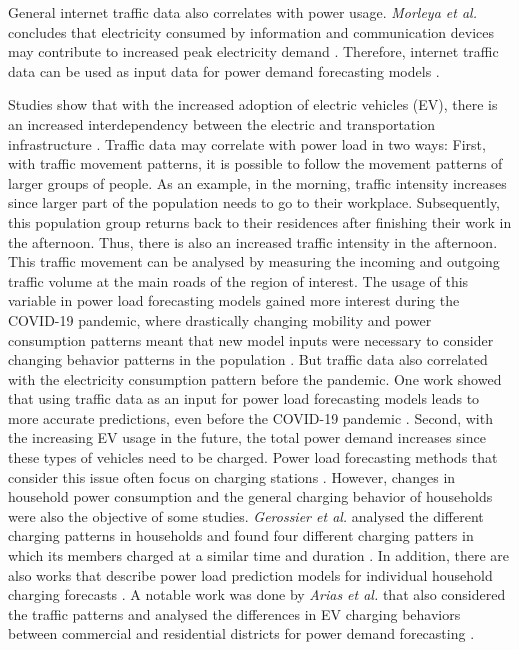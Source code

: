 General internet traffic data also correlates with power usage.
\textit{Morleya et al.} concludes that 
electricity consumed by information and communication devices
may contribute to increased peak electricity demand 
\cite{internettrafficenergycorrelation}.
Therefore, internet traffic data can be used as input data for 
power demand forecasting models \cite{electricityinternetforecast}. 

Studies show that with the increased adoption of electric vehicles (EV), 
there is an increased interdependency between the electric and 
transportation infrastructure \cite{interdependnytrafficenergy}. 
Traffic data may correlate with power load in two ways:
First, with traffic movement patterns, it is possible to follow the
movement patterns of larger groups of people. As an example, in the morning,
traffic intensity increases since larger part of the population needs
to go to their workplace. Subsequently, this population group
returns back to their residences after finishing their work in the afternoon.
Thus, there is also an increased traffic intensity in the afternoon.
This traffic movement can be analysed by measuring the 
incoming and outgoing traffic volume at the main roads of the 
region of interest. The usage of this variable in power load
forecasting models gained more interest during the COVID-19 pandemic, 
where drastically changing mobility and power consumption 
patterns meant that new model inputs were necessary to consider changing
behavior patterns in the population 
\cite{covidtrafficpower} \cite{covidtrafficpower2}.
But traffic data also correlated with the electricity consumption pattern
before the pandemic. One work showed that
using traffic data as an input for power load
forecasting models leads to more accurate predictions, even before
the COVID-19 pandemic \cite{causalmodeltrafficelectricity}.
Second, with the increasing EV usage in the future, 
the total power demand increases since these types of vehicles 
need to be charged. Power load forecasting methods that consider this
issue often focus on charging stations \cite{evcharchingstations}
\cite{evcharchingstations2}. However, changes in household power consumption 
and the general charging behavior of households
were also the objective of some studies. \textit{Gerossier et al.}
analysed the different charging patterns in households
and found four different charging patters in which its members charged at 
a similar time and duration \cite{gerossier2019modeling}.
In addition, there are also works that describe
power load prediction models for individual household
charging forecasts \cite{skala2023interval}. 
A notable work was done by \textit{Arias et al.} that also considered the traffic patterns
and analysed the differences in EV charging behaviors between
commercial and residential districts for power demand forecasting
\cite{arias2016electric}.

